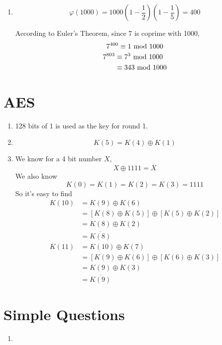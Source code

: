 \documentclass{article}
\renewcommand{\mod}{{\rm\ mod\ }}
\begin{document}
\begin{enumerate}
\item
$$\varphi(1000)=1000\left(1-\frac{1}{2}\right)\left(1-\frac{1}{5}\right)=400$$

According to Euler's Theorem, since 7 is coprime with 1000, $$7^{400}\equiv1\mod1000$$
\begin{align*}
7^{803}&\equiv7^3\mod1000\\
&\equiv343\mod1000
\end{align*}
\end{enumerate}

\section{AES}
\begin{enumerate}
\item
128 bits of 1 is used as the key for round 1.
\item
$$K(5)=K(4)\oplus K(1)$$
\item
We know for a 4 bit number $X$, $$X\oplus 1111=\overline{X}$$
We also know $$K(0)=K(1)=K(2)=K(3)=1111$$
So it's easy to find
\begin{align*}
K(10)&=K(9)\oplus K(6)\\
&=[K(8)\oplus K(5)]\oplus[K(5)\oplus K(2)]\\
&=K(8)\oplus K(2)\\
&=\overline{K(8)}\\
K(11)&=K(10)\oplus K(7)\\
&=[K(9)\oplus K(6)]\oplus[K(6)\oplus K(3)]\\
&=K(9)\oplus K(3)\\
&=\overline{K(9)}
\end{align*}
\end{enumerate}

\section{Simple Questions}
\begin{enumerate}
\item

\end{enumerate}
\end{document}
